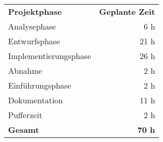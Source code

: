 \begin{tabular}{lr}
\rowcolor{heading}\textbf{Projektphase} & \textbf{Geplante Zeit} \\
Analysephase & 6 h \\
\rowcolor{odd}Entwurfsphase & 21 h \\
Implementierungsphase & 26 h \\
\rowcolor{odd}Abnahme & 2 h \\
Einführungsphase & 2 h \\
\rowcolor{odd}Dokumentation & 11 h \\
\hline
Pufferzeit & 2 h \\
\hline
\hline
\rowcolor{odd}\textbf{Gesamt} & \textbf{70 h} \\
\end{tabular}
